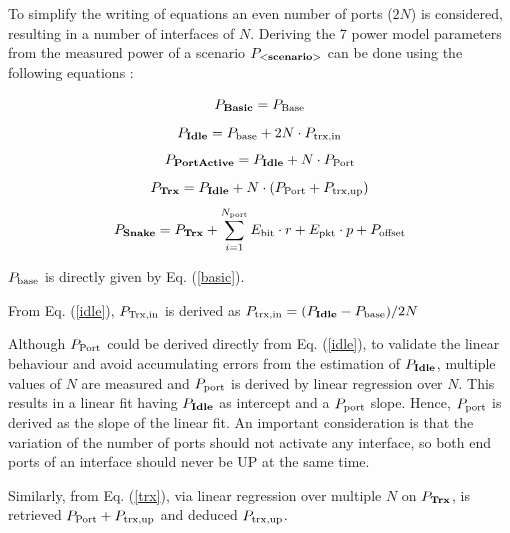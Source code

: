 To simplify the writing of equations an even number of ports ($2N$) is considered, resulting in a number of interfaces of $N$.   
Deriving the 7 power model parameters from the measured power of a scenario $P_\textnormal{<\textbf{scenario}>}$ can be done using the following equations :

\begin{equation}
	 P_{\textnormal{\textbf{Basic}}} = P_{\textnormal{Base}}
	 \label{basic}
\end{equation}
\begin{equation}
	P_{\textnormal{\textbf{Idle}}} =  P_{\textnormal{base}} + 2N \cdot P_{\textnormal{trx,in}}
	 \label{idle}
\end{equation}
\begin{equation}
	P_{\textnormal{\textbf{PortActive}}} =  P_{\textnormal{\textbf{Idle}}} + N \cdot P_\textnormal{Port} 
\end{equation}
\begin{equation}
	P_{\textnormal{\textbf{Trx}}} =  P_{\textnormal{\textbf{Idle}}} + N \cdot (P_\textnormal{Port} + P_{\textnormal{trx,up}})
	 \label{trx}
\end{equation}
\begin{equation}
	P_{\textnormal{\textbf{Snake}}} =  P_{\textnormal{\textbf{Trx}}} +   \sum_{i=1}^{N_\textnormal{port}} E_\textnormal{bit} \cdot r + E_\textnormal{pkt} \cdot p + P_\textnormal{offset}
	 \label{snake}
\end{equation}

$P_\textnormal{base}$ is directly given by Eq. (\ref{basic}).

From Eq. (\ref{idle}), $P_\textnormal{Trx,in}$ is derived as $P_{\textnormal{trx,in}} =  (P_{\textnormal{\textbf{Idle}}} - P_{\textnormal{base}}) / 2N  $

Although $P_\textnormal{Port}$ could be derived directly from Eq. (\ref{idle}), to validate the linear behaviour and avoid accumulating errors from the estimation of $P_{\textnormal{\textbf{Idle}}}$, multiple values of $N$ are measured and $P_\textnormal{port}$ is derived by linear regression over $N$. This results in a linear fit having $P_\textnormal{\textbf{Idle}}$ as intercept and a $P_\textnormal{port}$ slope. Hence, $P_\textnormal{port}$ is derived as the slope of the linear fit.   
An important consideration is that the variation of the number of ports should not activate any interface, so both end ports of an interface should never be UP at the same time.

Similarly, from Eq. (\ref{trx}), via linear regression over multiple $N$ on $P_\textnormal{\textbf{Trx}}$, is retrieved $P_\textnormal{Port} + P_{\textnormal{trx,up}}$ and deduced $P_{\textnormal{trx,up}}$.

